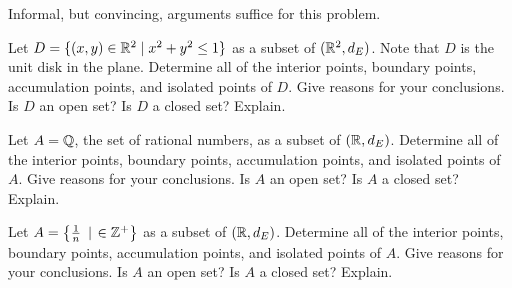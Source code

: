  \label{sec_closed_set_exer}

\be

\item Informal, but convincing, arguments suffice for this problem.

\ba  

\item Let $D = \{(x,y) \in \mathbb{R}^2 \mid x^2+y^2 \leq 1\}$ as a subset of $(\mathbb{R}^2,d_E)$. Note that $D$ is the unit disk in the plane. Determine all of the interior points, boundary points, accumulation points, and isolated points of $D$. Give reasons for your conclusions. Is $D$ an open set? Is $D$ a closed set? Explain.

\item Let $A = \mathbb{Q}$, the set of rational numbers, as a subset of $(\mathbb{R},d_E)$. Determine all of the interior points, boundary points, accumulation points, and isolated points of $A$. Give reasons for your conclusions. Is $A$ an open set? Is $A$ a closed set? Explain. 

\item Let $A = \left\{\frac{1}{n} \ \left| \right. \in \mathbb{Z}^+\right\}$ as a subset of $(\mathbb{R},d_E)$. Determine all of the interior points, boundary points, accumulation points, and isolated points of $A$. Give reasons for your conclusions. Is $A$ an open set? Is $A$ a closed set? Explain.


\ea

